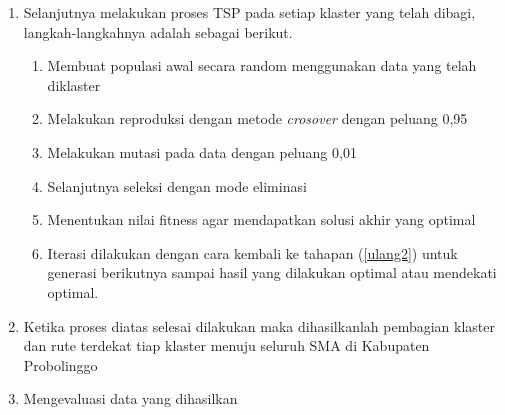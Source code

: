\begin{enumerate}
	\item Selanjutnya melakukan proses TSP pada setiap klaster yang telah dibagi, langkah-langkahnya adalah sebagai berikut.
	\begin{enumerate}
	    \item Membuat populasi awal secara random menggunakan data yang telah diklaster
	    \item \label{ulang2} Melakukan reproduksi dengan metode \textit{crosover} dengan peluang 0,95
	    \item Melakukan mutasi pada data dengan peluang 0,01
	    \item Selanjutnya seleksi dengan mode eliminasi
	    \item Menentukan nilai fitness agar mendapatkan solusi akhir yang optimal
	    \item Iterasi dilakukan dengan cara kembali ke tahapan (\ref{ulang2}) untuk generasi berikutnya sampai hasil yang dilakukan optimal atau mendekati optimal.
    \end{enumerate}
	\item Ketika proses diatas selesai dilakukan maka dihasilkanlah pembagian klaster dan rute terdekat tiap klaster menuju seluruh SMA di Kabupaten Probolinggo
	\item Mengevaluasi data yang dihasilkan
\end{enumerate}
